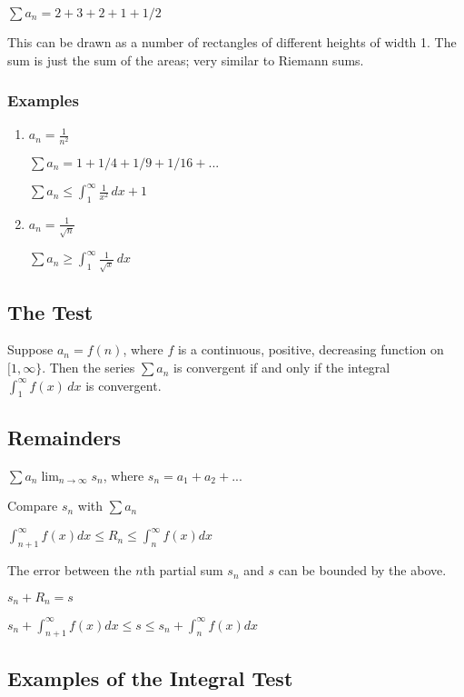 \documentclass{article}
\begin{document}
$\sum a_n = 2+3+2+1+1/2$

This can be drawn as a number of rectangles of different heights of width 1. The sum is just the sum of the areas; very similar to Riemann sums.

\subsubsection{Examples}

\begin{enumerate}
    \item $a_n=\frac{1}{n^2}$

$\sum a_n = 1+1/4+1/9+1/16+...$

$\sum a_n \leq \int_1^{\infty} \frac{1}{x^2} \,dx +1 $

    \item $a_n = \frac{1}{\sqrt{n}}$
    
    $\sum a_n \geq \int_1^{\infty} \frac{1}{\sqrt{x}} \,dx$
    

\end{enumerate}

\subsection{The Test}

Suppose $a_n=f(n)$, where $f$ is a continuous, positive, decreasing function on $[1,\infty\}$. Then the series $\sum a_n$ is convergent if and only if the integral $\int_1^{\infty} f(x) \,dx$ is convergent.


\subsection{Remainders}

$\sum a_n \lim_{n\to\infty} s_n$, where $s_n=a_1+a_2+...$

Compare $s_n$ with $\sum a_n$

$\int_{n+1}^{\infty} f(x) dx \leq R_n \leq \int_{n}^{\infty} f(x) dx $

The error between the $n$th partial sum $s_n$ and $s$ can be bounded by the above.

$s_n+R_n=s$

$s_n + \int_{n+1}^{\infty} f(x) dx \leq s \leq s_n+\int_{n}^{\infty} f(x) dx $


\subsection{Examples of the Integral Test}
\end{document}
